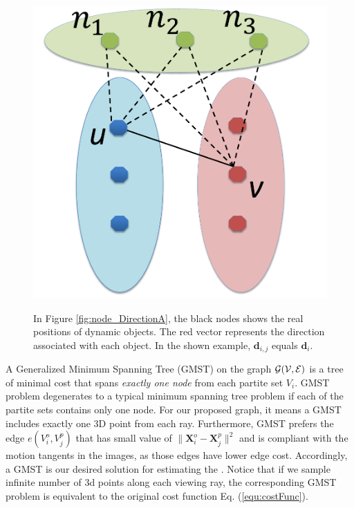 \begin{figure}[t]
{    \includegraphics[height=0.19\textheight]{chapter4/resource/edgeReduction_cropped.pdf}
    \label{fig:node_edgeRemove}
}

\caption{In Figure \ref{fig:node_DirectionA}, the black nodes shows the real positions of dynamic objects. The red vector represents the direction associated with each object. In the shown example, $\mathbf{d}_{i,j}$ equals $\mathbf{d}_{i}$.  }
\label{fig:nodeDirection}
\end{figure}

A Generalized Minimum Spanning Tree (GMST) on the graph $\cal{G}(V,E)$ is a tree of minimal cost that spans \emph{exactly one node} from each partite set $V_i$. GMST problem degenerates to a typical minimum spanning tree problem \cite{Cormen:2001:IA:580470} if each of the partite sets contains only one node.
For our proposed graph, it means a GMST includes exactly one 3D point from each ray. Furthermore, GMST prefers the edge $e(V_i^o,V_j^p)$ that has small value of $\|\mathbf{X}_i^o-\mathbf{X}_j^p\|^2$ and is compliant with the motion tangents in the images, as those edges have lower edge cost. Accordingly, a GMST is our desired solution for estimating the \oct. Notice that if we sample infinite number of 3d points along each viewing ray, the corresponding GMST problem is equivalent to the original cost function Eq. (\ref{equ:costFunc}).%

